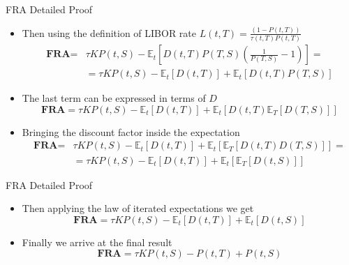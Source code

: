 \documentclass{beamer}
\begin{document}
\begin{frame}{FRA Detailed Proof}
	\begin{itemize}
		\item<1-> Then using the definition of LIBOR rate $L(t,T)=\frac{(1-P(t,T))}{\tau(t,T)P(t,T)}$
		\begin{equation*}
			\begin{aligned}
			\textbf{FRA} = &\tau KP(t,S)-\mathbb{E}_t\left[D(t,T)P(T,S)\left(\frac{1}{P(T,S)}-1\right)\right]= \\
			&=\tau KP(t,S)-\mathbb{E}_t[D(t,T)] + \mathbb{E}_t[D(t,T)P(T,S)]
			\end{aligned}
		\end{equation*}
		\item<2-> The last term can be expressed in terms of $D$
		\begin{equation*}
			\textbf{FRA} = \tau KP(t,S)-\mathbb{E}_t[D(t,T)] + \mathbb{E}_t\left[D(t,T)\mathbb{E}_T[D(T,S)]\right]
		\end{equation*}		
		\item<2-> Bringing the discount factor inside the expectation
		\begin{equation*}
			\begin{aligned}
			\textbf{FRA} = &\tau KP(t,S)-\mathbb{E}_t[D(t,T)] + 				\mathbb{E}_t\left[\mathbb{E}_T[D(t,T)D(T,S)]\right]=\\
			&=\tau KP(t,S)-\mathbb{E}_t[D(t,T)] + 				\mathbb{E}_t\left[\mathbb{E}_T[D(t,S)]\right]
			\end{aligned}
		\end{equation*}		
	\end{itemize}
\end{frame}

\begin{frame}{FRA Detailed Proof}
	\begin{itemize}
		\item<1-> Then applying the law of iterated expectations we get
		\begin{equation*}
		\textbf{FRA} = \tau KP(t,S)-\mathbb{E}_t[D(t,T)] + 			\mathbb{E}_t[D(t,S)]
		\end{equation*}
	\item<2-> Finally we arrive at the final result
	\begin{equation*}
	\textbf{FRA} = \tau KP(t,S) - P(t,T) + P(t,S)
	\end{equation*}
	\myendproof
	\end{itemize}
\end{frame}
\end{document}

